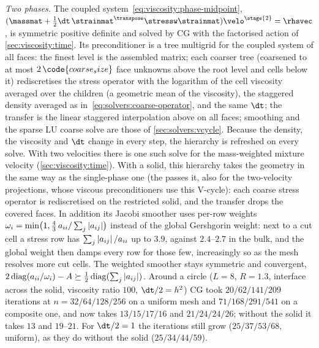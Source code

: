 \emph{Two phases.} The coupled system~\cref{eq:viscosity:phase-midpoint},
$(\massmat+\tfrac12\dt\,\strainmat^{\transpose}\stressw\strainmat)\velo^{\stage{2}}=\rhsvec$,
is symmetric positive definite and solved by CG with the factorised action of
\cref{sec:viscosity:time}. Its preconditioner is a tree multigrid for the
coupled system of all faces: the finest level is the assembled matrix; each
coarser tree (coarsened to at most $2\,\code{coarse_size}$ face unknowns above
the root level and  cells below it) rediscretises the stress
operator with the logarithm of the cell viscosity averaged over the children
(a geometric mean of the viscosity), the staggered density averaged as
in~\cref{eq:solvers:coarse-operator}, and the same $\dt$; the transfer is the
linear staggered interpolation above on all faces; smoothing and the sparse
LU coarse solve are those of \cref{sec:solvers:vcycle}. Because the density,
the viscosity and $\dt$ change in every step, the hierarchy is refreshed on
every solve. With two velocities there is one such solve for the mass-weighted
mixture velocity (\cref{sec:viscosity:time}).
With a solid, this hierarchy takes the geometry in the same way as the
single-phase one (the  passes it, also for the
two-velocity projections, whose viscous preconditioners use this V-cycle):
each coarse stress operator is rediscretised on the restricted solid, and the
transfer drops the covered faces. In addition its Jacobi
smoother uses per-row weights
$\omega_i=\min\bigl(1,\tfrac43\,a_{ii}/\textstyle\sum_j\left\lvert a_{ij} \right\rvert\bigr)$
instead of the global Gershgorin weight: next to a cut cell a stress row has
$\sum_j\left\lvert a_{ij} \right\rvert/a_{ii}$ up to $3.9$, against $2.4$--$2.7$ in the bulk, and
the global weight then damps every row for those few, increasingly so as the
mesh resolves more cut cells. The weighted smoother stays symmetric and
convergent, $2\operatorname{diag}(a_{ii}/\omega_i)-A\succeq\tfrac12\operatorname{diag}(\sum_j\left\lvert a_{ij} \right\rvert)$.
Around a circle ($L=8$, $R=1.3$, interface across the solid, viscosity ratio
$100$, $\dt/2=h^2$) CG took $20/62/141/209$ iterations at $n=32/64/128/256$
on a uniform mesh and $71/168/291/541$ on a composite one, and now takes
$13/15/17/16$ and $21/24/24/26$; without the solid it takes $13$ and
$19$--$21$. For $\dt/2=1$ the iterations still grow ($25/37/53/68$, uniform),
as they do without the solid ($25/34/44/59$).

